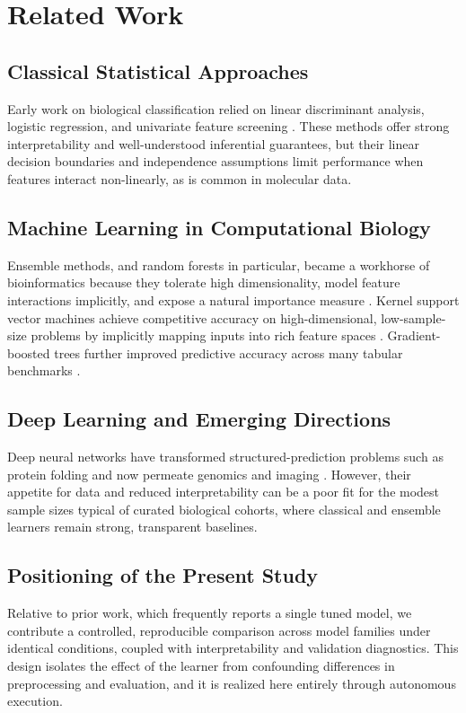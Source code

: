 \documentclass[conference]{IEEEtran}
\begin{document}
\section{Related Work}
\label{sec:related}
\subsection{Classical Statistical Approaches}
Early work on biological classification relied on linear discriminant analysis, logistic
regression, and univariate feature screening \cite{hastie2009elements}. These methods offer
strong interpretability and well-understood inferential guarantees, but their linear decision
boundaries and independence assumptions limit performance when features interact non-linearly,
as is common in molecular data.

\subsection{Machine Learning in Computational Biology}
Ensemble methods, and random forests in particular, became a workhorse of bioinformatics because
they tolerate high dimensionality, model feature interactions implicitly, and expose a natural
importance measure \cite{breiman2001random,saeys2007review}. Kernel support vector machines
achieve competitive accuracy on high-dimensional, low-sample-size problems by implicitly mapping
inputs into rich feature spaces \cite{cortes1995support,scholkopf2002learning}. Gradient-boosted
trees further improved predictive accuracy across many tabular benchmarks \cite{friedman2001greedy,chen2016xgboost}.

\subsection{Deep Learning and Emerging Directions}
Deep neural networks have transformed structured-prediction problems such as protein folding
\cite{jumper2021highly} and now permeate genomics and imaging \cite{ching2018opportunities,goodfellow2016deep}.
However, their appetite for data and reduced interpretability can be a poor fit for the modest
sample sizes typical of curated biological cohorts, where classical and ensemble learners remain
strong, transparent baselines.

\subsection{Positioning of the Present Study}
Relative to prior work, which frequently reports a single tuned model, we contribute a controlled,
reproducible comparison across model families under identical conditions, coupled with
interpretability and validation diagnostics. This design isolates the effect of the learner from
confounding differences in preprocessing and evaluation, and it is realized here entirely through
autonomous execution.
\end{document}
